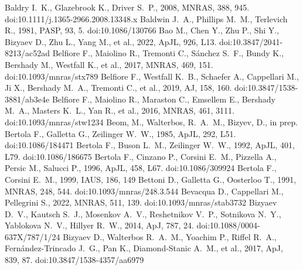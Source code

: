 \documentclass[fleqn,usenatbib]{mnras}
\begin{document}
\begin{thebibliography}{}
 Baldry I.~K., Glazebrook K., Driver S.~P., 2008, MNRAS, 388, 945. doi:10.1111/j.1365-2966.2008.13348.x
 Baldwin J.~A., Phillips M.~M., Terlevich R., 1981, PASP, 93, 5. doi:10.1086/130766
 Bao M., Chen Y., Zhu P., Shi Y., Bizyaev D., Zhu L., Yang M., et al., 2022, ApJL, 926, L13. doi:10.3847/2041-8213/ac52ad
 Belfiore F., Maiolino R., Tremonti C., S{\'a}nchez S.~F., Bundy K., Bershady M., Westfall K., et al., 2017, MNRAS, 469, 151. doi:10.1093/mnras/stx789
 Belfiore F., Westfall K.~B., Schaefer A., Cappellari M., Ji X., Bershady M.~A., Tremonti C., et al., 2019, AJ, 158, 160. doi:10.3847/1538-3881/ab3e4e
 Belfiore F., Maiolino R., Maraston C., Emsellem E., Bershady M.~A., Masters K.~L., Yan R., et al., 2016, MNRAS, 461, 3111. doi:10.1093/mnras/stw1234
 Beom, M., Walterbos, R.~A.~M., Bizyev, D., in prep.
 Bertola F., Galletta G., Zeilinger W.~W., 1985, ApJL, 292, L51. doi:10.1086/184471
 Bertola F., Buson L.~M., Zeilinger W.~W., 1992, ApJL, 401, L79. doi:10.1086/186675
 Bertola F., Cinzano P., Corsini E.~M., Pizzella A., Persic M., Salucci P., 1996, ApJL, 458, L67. doi:10.1086/309924
 Bertola F., Corsini E.~M., 1999, IAUS, 186, 149
 Bettoni D., Galletta G., Oosterloo T., 1991, MNRAS, 248, 544. doi:10.1093/mnras/248.3.544
 Bevacqua D., Cappellari M., Pellegrini S., 2022, MNRAS, 511, 139. doi:10.1093/mnras/stab3732
 Bizyaev D.~V., Kautsch S.~J., Mosenkov A.~V., Reshetnikov V.~P., Sotnikova N.~Y., Yablokova N.~V., Hillyer R.~W., 2014, ApJ, 787, 24. doi:10.1088/0004-637X/787/1/24
 Bizyaev D., Walterbos R.~A.~M., Yoachim P., Riffel R.~A., Fern{\'a}ndez-Trincado J.~G., Pan K., Diamond-Stanic A.~M., et al., 2017, ApJ, 839, 87. doi:10.3847/1538-4357/aa6979

\end{thebibliography}
\end{document}
